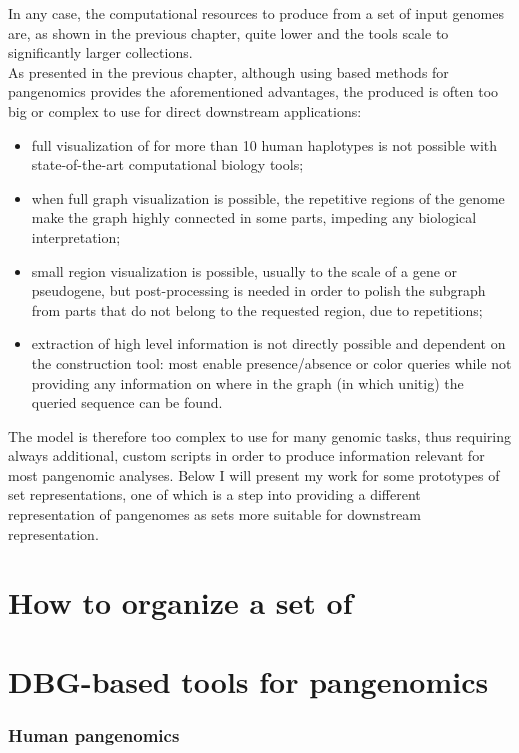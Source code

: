 In any case, the computational resources to produce \ccdbg from a set of input genomes are, as shown in the previous chapter, quite lower and the tools scale to significantly larger collections. \\
As presented in the previous chapter, although using \kmer based methods for pangenomics provides the aforementioned advantages, the produced \dbg is often too big or complex to use for direct downstream applications:
\begin{itemize}
	\item full visualization of \dbgs for more than 10 human haplotypes is not possible with state-of-the-art computational biology tools;
	\item when full graph visualization is possible, the repetitive regions of the genome make the graph highly connected in some parts, impeding any biological interpretation;
	\item small region visualization is possible, usually to the scale of a gene or pseudogene, but post-processing is needed in order to polish the subgraph from parts that do not belong to the requested region, due to repetitions;
	\item extraction of high level information is not directly possible and dependent on the construction tool: most enable presence/absence or color queries while not providing any information on where in the graph (in which unitig) the queried sequence can be found.
\end{itemize}
The \dbg model is therefore too complex to use for many genomic tasks, thus requiring always additional, custom scripts in order to produce information relevant for most pangenomic analyses.
Below I will present my work for some prototypes of \kmer set representations, one of which is a step into providing a different representation of pangenomes as \kmer sets more suitable for downstream representation.

\section{How to organize a set of \kmers}

\section{DBG-based tools for pangenomics}

\subsubsection{Human pangenomics}

